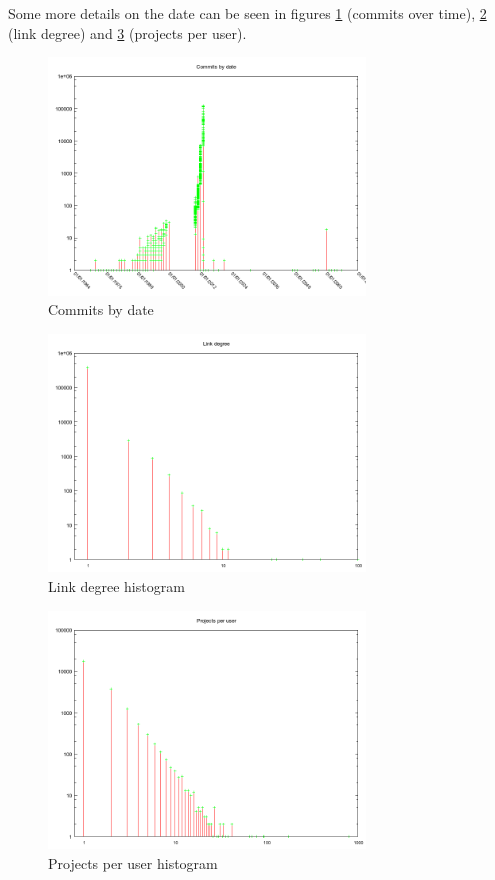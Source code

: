 \documentclass[10pt,a4paper]{article}
\begin{document}
Some more details on the date can be seen in figures \ref{fig:commits-by-date} (commits over time), \ref{fig:link-degree-hist} (link degree) and \ref{fig:projects-per-user-hist} (projects per user).

\begin{figure}[htb]
    \centering
    \includegraphics[width=0.75\textwidth]{commits-per-week}
    \caption{Commits by date}
    \label{fig:commits-by-date}
\end{figure}

\begin{figure}[htb]
    \centering
    \includegraphics[width=0.75\textwidth]{link-degree-histogram}
    \caption{Link degree histogram}
    \label{fig:link-degree-hist}
\end{figure}

\begin{figure}[htb]
    \centering
    \includegraphics[width=0.75\textwidth]{projects-per-user-histogram}
    \caption{Projects per user histogram}
    \label{fig:projects-per-user-hist}
\end{figure}
\end{document}
